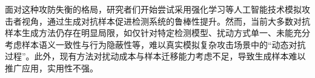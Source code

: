 
面对这种攻防失衡的格局，研究者们开始尝试采用强化学习等人工智能技术模拟攻击者视角，通过生成对抗样本促进检测系统的鲁棒性提升。然而，当前大多数对抗样本生成方法仍存在明显局限，如仅针对特定检测模型、扰动方式单一、未能充分考虑样本语义一致性与行为隐蔽性等，难以真实模拟复杂攻击场景中的“动态对抗过程”\cite{yu2022natural, ilahi2021challenges, labaca2021aimed,standen2025adversarial}。此外，现有方法对扰动成本与样本迁移能力考虑不足，导致生成样本难以推广应用，实用性不强。



